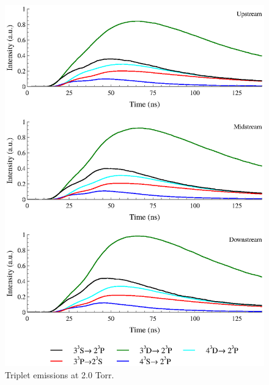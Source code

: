 \begin{figure}
  \centering
  \includegraphics{./chapters/extraem/figures/2torr_t.eps}
  \caption{Triplet emissions at 2.0 Torr.}
\end{figure}

